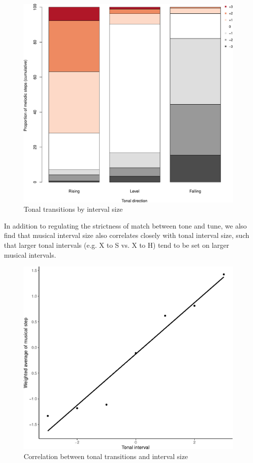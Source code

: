 \documentclass[output=paper]{langscibook}
\begin{document}
\begin{figure}[p]
  \includegraphics[width=\textwidth]{figures/TonalInterval.pdf}
  \caption{Tonal transitions by interval size\label{fig:transitions:size}}
\end{figure}

In addition to regulating the strictness of match between tone and tune, we also find that musical interval size also correlates closely with tonal interval size, such that larger tonal intervals (e.g. X to S vs. X to H) tend to be set on larger musical intervals. 

\begin{figure}
  \includegraphics[width=.66\textwidth]{figures/WeightedAverageScatter.pdf}
  \caption{Correlation between tonal transitions and interval size\label{fig:mcpherson:WeightedAverageScatter}}
\end{figure}
\end{document}
